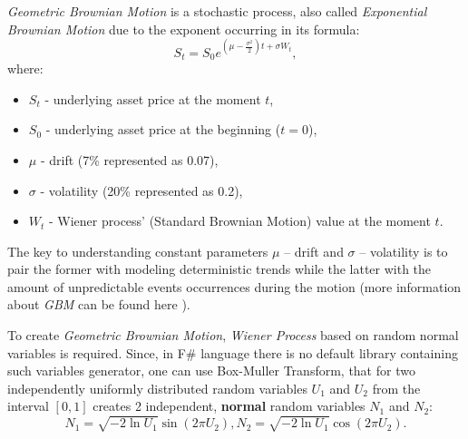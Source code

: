         \textit{Geometric Brownian Motion} is a stochastic process, also called \textit{Exponential Brownian Motion} due to the exponent occurring in its formula:
        \[
        S_t = S_0e^{(\mu - \frac{\sigma^2}{2})t + \sigma W_t}
        ,
        \]
        where:
        \begin{itemize}
        \item $S_t$ - underlying asset price at the moment $t$,
        \item $S_0$ - underlying asset price at the beginning ($t=0$),
        \item $\mu$ - drift (7\% represented as 0.07),
        \item $\sigma$ - volatility (20\% represented as 0.2),
        \item $W_t$ - Wiener process' (Standard Brownian Motion) value at the moment $t$.
    \end{itemize}
    The key to understanding constant parameters $\mu$ -- drift and $\sigma$ -- volatility is to pair the former with modeling deterministic trends while the latter with the amount of unpredictable events occurrences during the motion (more information about \textit{GBM} can be found here \cite{gbm}).
    
    To create \textit{Geometric Brownian Motion}, \textit{Wiener Process} based on random normal variables is required. Since, in F\# language there is no default library containing such variables generator, one can use Box-Muller Transform, that for two independently uniformly distributed random variables $U_1$ and $U_2$ from the interval $[0,1]$ creates 2 independent, \textbf{normal} random variables $N_1$ and $N_2$:
    \[
    N_1 = \sqrt{-2\ln{U_1}}\sin(2\pi U_2), N_2 = \sqrt{-2\ln{U_1}}\cos(2\pi U_2)
    .
    \]
    
